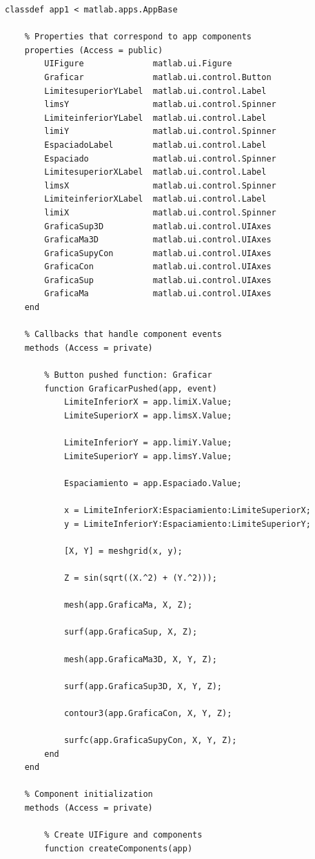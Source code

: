 \documentclass{article}
\begin{document}
	\begin{lstlisting}
classdef app1 < matlab.apps.AppBase
	
	% Properties that correspond to app components
	properties (Access = public)
		UIFigure              matlab.ui.Figure
		Graficar              matlab.ui.control.Button
		LimitesuperiorYLabel  matlab.ui.control.Label
		limsY                 matlab.ui.control.Spinner
		LimiteinferiorYLabel  matlab.ui.control.Label
		limiY                 matlab.ui.control.Spinner
		EspaciadoLabel        matlab.ui.control.Label
		Espaciado             matlab.ui.control.Spinner
		LimitesuperiorXLabel  matlab.ui.control.Label
		limsX                 matlab.ui.control.Spinner
		LimiteinferiorXLabel  matlab.ui.control.Label
		limiX                 matlab.ui.control.Spinner
		GraficaSup3D          matlab.ui.control.UIAxes
		GraficaMa3D           matlab.ui.control.UIAxes
		GraficaSupyCon        matlab.ui.control.UIAxes
		GraficaCon            matlab.ui.control.UIAxes
		GraficaSup            matlab.ui.control.UIAxes
		GraficaMa             matlab.ui.control.UIAxes
	end
	
	% Callbacks that handle component events
	methods (Access = private)
	
		% Button pushed function: Graficar
		function GraficarPushed(app, event)
			LimiteInferiorX = app.limiX.Value;
			LimiteSuperiorX = app.limsX.Value;
			
			LimiteInferiorY = app.limiY.Value;
			LimiteSuperiorY = app.limsY.Value;
			
			Espaciamiento = app.Espaciado.Value;
			
			x = LimiteInferiorX:Espaciamiento:LimiteSuperiorX;
			y = LimiteInferiorY:Espaciamiento:LimiteSuperiorY;
			
			[X, Y] = meshgrid(x, y);
			
			Z = sin(sqrt((X.^2) + (Y.^2)));
			
			mesh(app.GraficaMa, X, Z);
			
			surf(app.GraficaSup, X, Z);
			
			mesh(app.GraficaMa3D, X, Y, Z);
			
			surf(app.GraficaSup3D, X, Y, Z);
			
			contour3(app.GraficaCon, X, Y, Z);
			
			surfc(app.GraficaSupyCon, X, Y, Z);
		end
	end
	
	% Component initialization
	methods (Access = private)
	
		% Create UIFigure and components
		function createComponents(app)
		

\end{lstlisting}
\end{document}

